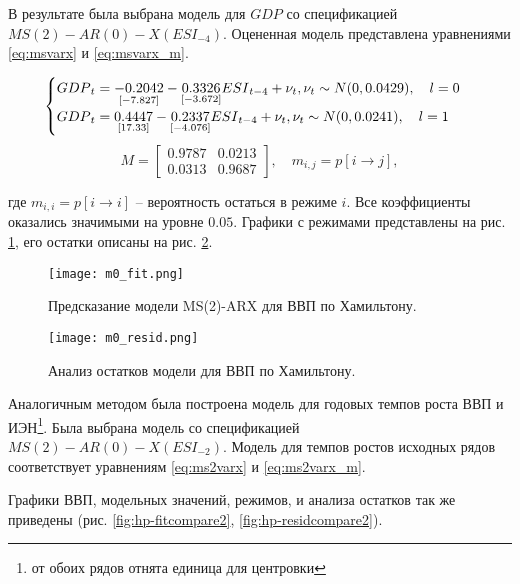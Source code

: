 \documentclass[a4paper,14pt]{extreport}
\begin{document}
	В результате была выбрана модель для ${GDP}$ со спецификацией $MS(2)-AR(0)-X({ESI}_{-4})$. Оцененная модель представлена уравнениями \ref{eq:msvarx} и \ref{eq:msvarx_m}.
	
	{
		
		\begin{equation}
		\label{eq:msvarx}
		\begin{cases}
		{GDP}_{t} = 
		\underset{[-7.827]}{-0.2042} 
		- \underset{[-3.672]}{0.3326} {ESI}_{t-4}
		+ \nu_{t} , \space \nu_{t} \sim N(0, 0.0429)
		, \quad l=0 \\
		{GDP}_{t} = 
		\underset{[17.33]}{0.4447}
		- \underset{[-4.076]}{0.2337} {ESI}_{t-4}
		+ \nu_{t} , \space \nu_{t} \sim N(0, 0.0241)
		, \quad l=1
		\end{cases}			
		\end{equation}
		\begin{equation}
		\label{eq:msvarx_m}
		M = 
		\begin{bmatrix}
		0.9787 & 0.0213 \\
		0.0313 & 0.9687
		\end{bmatrix}
		, \quad m_{i,j} = p[i \rightarrow j],
		\end{equation}
		
	}
	
	где $m_{i,i} = p[i \rightarrow i]$ – вероятность остаться в режиме $i$. Все коэффициенты оказались значимыми на уровне $0.05$. Графики с режимами представлены на рис. \ref{fig:hp-fitcompare}, его остатки описаны на рис. \ref{fig:hp-residcomp}.
	
	{
		\begin{figure}
			\texttt{[image: m0\_fit.png]}
			\caption{Предсказание модели MS(2)-ARX для ВВП по Хамильтону.}
			\label{fig:hp-fitcompare}
		\end{figure}
		\begin{figure}
			\texttt{[image: m0\_resid.png]}
			\caption{Анализ остатков модели для ВВП по Хамильтону.}
			\label{fig:hp-residcomp}
		\end{figure}
	}
	
	
	Аналогичным методом была построена модель для годовых темпов роста ВВП и ИЭН\footnote{от обоих рядов отнята единица для центровки}. Была выбрана модель со спецификацией $MS(2)-AR(0)-X({ESI}_{-2})$. Модель для темпов ростов исходных рядов соответствует уравнениям \ref{eq:ms2varx} и \ref{eq:ms2varx_m}.
	
	Графики ВВП, модельных значений, режимов, и анализа остатков так же приведены (рис. \ref{fig:hp-fitcompare2}, \ref{fig:hp-residcompare2}).
	
\end{document}
